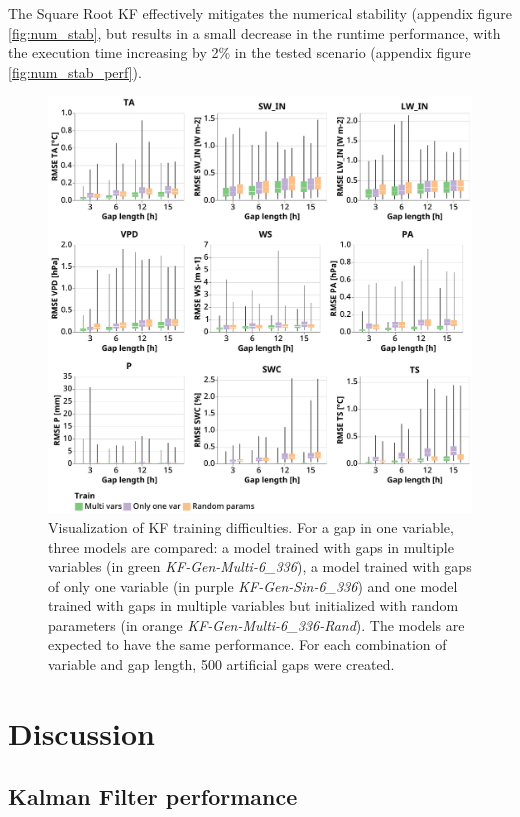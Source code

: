 \documentclass{article}
\newcommand{\imgwidth}{6in}
\let\Oldsection\section
\renewcommand{\section}{\FloatBarrier\Oldsection}
\let\Oldsubsection\subsection
\renewcommand{\subsection}{\FloatBarrier\Oldsubsection}
\begin{document}
The Square Root KF effectively mitigates the numerical stability (appendix figure \ref{fig:num_stab}, but results in a small decrease in the runtime performance, with the execution time increasing by 2\% in the tested scenario (appendix figure \ref{fig:num_stab_perf}).

\begin{figure}
\centerline{\includegraphics[width=\imgwidth]{train_compare}}
\caption{Visualization of KF training difficulties. For a gap in one variable, three models are compared: a model trained with gaps in multiple variables (in green \textit{KF-Gen-Multi-6\_336}), a model trained with gaps of only one variable (in purple \textit{KF-Gen-Sin-6\_336}) and one model trained with gaps in multiple variables but initialized with random parameters (in orange \textit{KF-Gen-Multi-6\_336-Rand}). The models are expected to have the same performance. For each combination of variable and gap length, 500 artificial gaps were created.}
\label{fig:train_compare}
\end{figure}

\section{Discussion}

\subsection{Kalman Filter performance}
\end{document}
